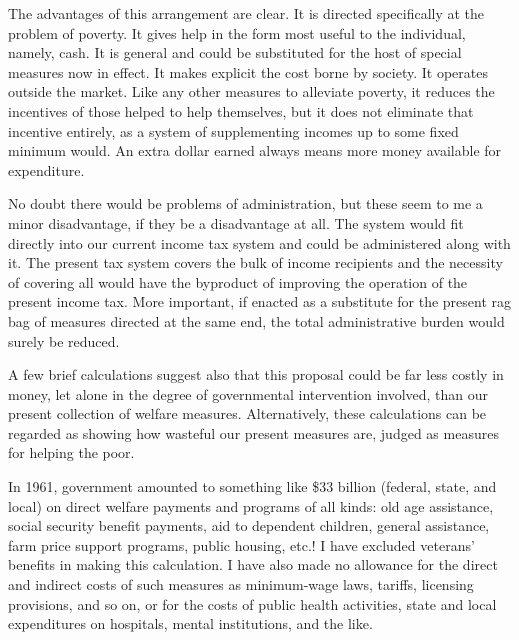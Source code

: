 \documentclass[11pt,openany]{book}
\begin{document}
The advantages of this arrangement are clear. It is directed specifically at the problem of poverty. It gives help in the form most useful to the individual, namely, cash. It is general and could be substituted for the host of special measures now in effect. It makes explicit the cost borne by society. It operates outside the market. Like any other measures to alleviate poverty, it reduces the incentives of those helped to help themselves, but it does not eliminate that incentive entirely, as a system of supplementing incomes up to some fixed minimum would. An extra dollar earned always means more money available for expenditure.

No doubt there would be problems of administration, but these seem to me a minor disadvantage, if they be a disadvantage at all. The system would fit directly into our current income tax system and could be administered along with it. The present tax system covers the bulk of income recipients and the necessity of covering all would have the byproduct of improving the operation of the present income tax. More important, if enacted as a substitute for the present rag bag of measures directed at the same end, the total administrative burden would surely be reduced.

A few brief calculations suggest also that this proposal could be far less costly in money, let alone in the degree of governmental intervention involved, than our present collection of welfare measures. Alternatively, these calculations can be regarded as showing how wasteful our present measures are, judged as measures for helping the poor.

In 1961, government amounted to something like \$33 billion (federal, state, and local) on direct welfare payments and programs of all kinds: old age assistance, social security benefit payments, aid to dependent children, general assistance, farm price support programs, public housing, etc.! I have excluded veterans' benefits in making this calculation. I have also made no allowance for the direct and indirect costs of such measures as minimum-wage laws, tariffs, licensing provisions, and so on, or for the costs of public health activities, state and local expenditures on hospitals, mental institutions, and the like.
\end{document}
